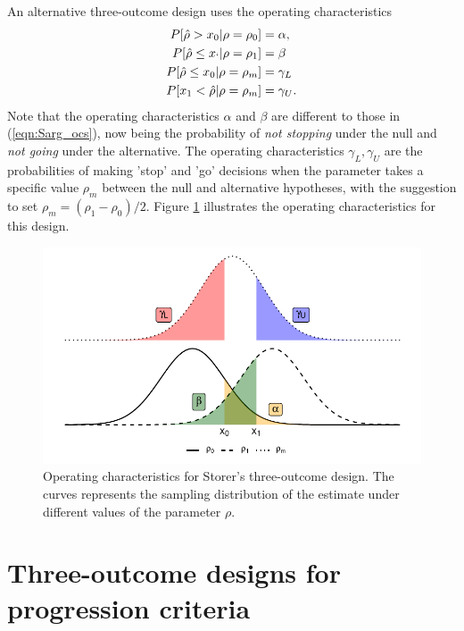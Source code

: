 \documentclass[sagev]{sagej} %
\begin{document}
An alternative three-outcome design \cite{Storer1992} uses the operating characteristics
\begin{equation}
\begin{aligned}
P[ \hat{\rho} > x_0 | \rho = \rho_0] & = \alpha, \\
P[ \hat{\rho} \leq x_` | \rho = \rho_1] & = \beta \\
P[ \hat{\rho} \leq x_ 0| \rho = \rho_m] & = \gamma_L \\
P[ x_1 < \hat{\rho} | \rho = \rho_m] & = \gamma_U.
\end{aligned}
\end{equation}\label{eqn:Stor_ocs}
Note that the operating characteristics $\alpha$ and $\beta$ are different to those in (\ref{eqn:Sarg_ocs}), now being the probability of \emph{not stopping} under the null and \emph{not going} under the alternative. The operating characteristics $\gamma_L, \gamma_U$ are the probabilities of making 'stop' and 'go' decisions when the parameter takes a specific value $\rho_m$ between the null and alternative hypotheses, with the suggestion to set $\rho_m = (\rho_1 - \rho_0)/2$. Figure \ref{fig:Stor_ocs} illustrates the operating characteristics for this design.

\begin{figure}
\centering
\includegraphics[scale=0.8]{./figures/Stor_ocs}
\caption{Operating characteristics for Storer's \cite{Storer1992} three-outcome design. The curves represents the sampling distribution of the estimate under different values of the parameter $\rho$.}
\label{fig:Stor_ocs}
\end{figure}


\section{Three-outcome designs for progression criteria}\label{sec:methods}
\end{document}
